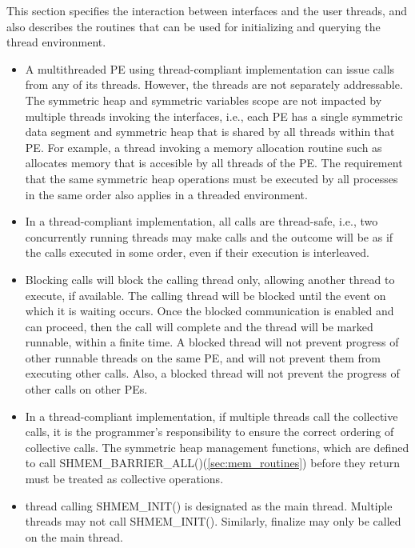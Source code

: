 This section specifies the interaction between \openshmem{} interfaces and the
user threads, and also describes the routines that can be used for initializing and 
querying the thread environment.
 

\begin{itemize}

\item
A multithreaded \openshmem{} \ac{PE} using thread-compliant implementation can issue
\openshmem{} calls from  any of its threads. However, the threads
are not separately addressable. The symmetric heap and symmetric variables scope
are not impacted by multiple threads invoking the
\openshmem{} interfaces, i.e., 
each \ac{PE} has a single symmetric data segment and symmetric heap that is shared by
all threads within that \ac{PE}.  For example, a thread invoking a memory allocation
routine such as  
allocates memory that is accesible by all threads of the \ac{PE}. 
The requirement that the same symmetric heap operations must
be executed by all processes in the same order also applies in a threaded
environment. 
                                    	
\item In a thread-compliant implementation, 
all \openshmem{} calls are thread-safe, i.e., two concurrently running threads
may make \openshmem{} calls and the outcome will be as if the calls executed in
some order, even if their execution is interleaved.

\item Blocking \openshmem{} calls will block the calling thread only, allowing another
thread to execute, if available. The calling thread will be blocked until the
event on which it is waiting occurs. Once the blocked communication is enabled
and can proceed, then the call will complete and the thread will be marked
runnable, within a finite time. A blocked thread will not prevent progress of
other runnable threads on the same \ac{PE}, and will not prevent them from
executing other \openshmem{} calls. Also, a blocked thread will not prevent the
progress of other \openshmem{} calls on other \acp{PE}. 
 
\item
In a thread-compliant implementation, if multiple threads call the collective
calls, it is the programmer's responsibility to ensure the correct ordering of
collective calls.  The symmetric heap management functions, which are defined to call
SHMEM\_BARRIER\_ALL()(\ref{sec:mem_routines}) before they return 
must be treated as collective operations.

\item
\openshmem{} thread calling SHMEM\_INIT() is designated as the main thread.
Multiple threads may not call SHMEM\_INIT(). Similarly, \openshmem{} finalize
may only be called on the main thread.

\end{itemize} 
 
